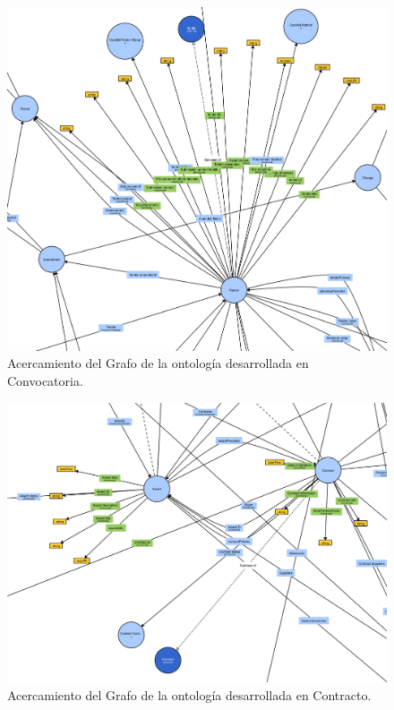     \begin{figure}[ht!]
        \includegraphics[width=150mm]{figuras/zoomTender.png}
        \caption{Acercamiento del Grafo de la ontología desarrollada en Convocatoria.}
        \label{img:zoomTender}
        \end{figure}


        \begin{figure}[ht!]
            \includegraphics[width=150mm]{figuras/zoomContract.png}
            \caption{Acercamiento del Grafo de la ontología desarrollada en Contracto.}
            \label{img:zoomContract}
            \end{figure}